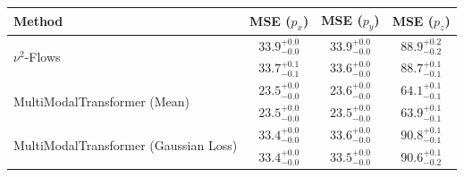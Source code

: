     \begin{tabular}{lccc}
        \toprule
        Method & MSE ($p_x$) & MSE ($p_y$) & MSE ($p_z$) \\
        \midrule
         \multirow{2}{*}{$\nu^2$-Flows}& $33.9_{-0.0}^{+0.0}$ & $33.9_{-0.0}^{+0.0}$ & $88.9_{-0.2}^{+0.2}$ \\
         & $33.7_{-0.1}^{+0.1}$ & $33.6_{-0.0}^{+0.0}$ & $88.7_{-0.1}^{+0.1}$ \\
        \midrule
         \multirow{2}{*}{MultiModalTransformer (Mean)}& $23.5_{-0.0}^{+0.0}$ & $23.6_{-0.0}^{+0.0}$ & $64.1_{-0.1}^{+0.1}$ \\
         & $23.5_{-0.0}^{+0.0}$ & $23.5_{-0.0}^{+0.0}$ & $63.9_{-0.1}^{+0.1}$ \\
        \midrule
         \multirow{2}{*}{MultiModalTransformer (Gaussian Loss)}& $33.4_{-0.0}^{+0.0}$ & $33.6_{-0.0}^{+0.0}$ & $90.8_{-0.1}^{+0.1}$ \\
         & $33.4_{-0.0}^{+0.0}$ & $33.5_{-0.0}^{+0.0}$ & $90.6_{-0.2}^{+0.1}$ \\
        \bottomrule
    \end{tabular}